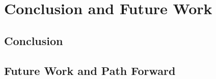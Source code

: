 \chapter{Conclusion and Future Work}
\label{ch:conclusion}

%
%
\section{Conclusion}
\label{sec:conclusion:conclusion}


%
%
\section{Future Work and Path Forward}
\label{sec:conclusion:futureWork}